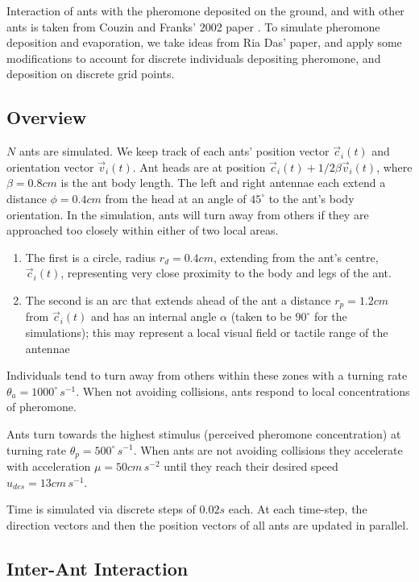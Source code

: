 Interaction of ants with the pheromone deposited on the ground, and with other ants is taken from Couzin and Franks' 2002 paper \cite{Couzin2003}. To simulate pheromone deposition and evaporation, we take ideas from Ria Das' paper, and apply some modifications to account for discrete individuals depositing pheromone, and deposition on discrete grid points.

\subsection{Overview}
$N$ ants are simulated. We keep track of each ants' position vector $\vec{c}_i(t)$ and orientation vector $\vec{v}_i(t)$. Ant heads are at position $\vec{c}_i(t) + 1/2 \beta \vec{v}_i(t)$, where $\beta = 0.8cm$ is the ant body length. The left and right antennae each extend a distance $\phi = 0.4cm$ from the head at an angle of $45^\circ$ to the ant’s body orientation. In the simulation, ants will turn away from others if they are approached too closely within either of two local areas. 

\begin{enumerate}
    \item The first is a circle, radius $r_d = 0.4 cm$, extending from the ant’s centre, $\vec{c}_i(t)$, representing very close proximity to the body and legs of the ant.
    \item The second is an arc that extends ahead of the ant a distance $r_p = 1.2 cm$ from $\vec{c}_i(t)$ and has an internal angle $\alpha$ (taken to be $90^\circ$ for the simulations); this may represent a local visual field or tactile range of the antennae
\end{enumerate} 

Individuals tend to turn away from others within these zones with a turning rate $\theta_a = 1000^\circ \, s^{-1}$. When not avoiding collisions, ants respond to local concentrations of pheromone.

Ants turn towards the highest stimulus (perceived pheromone concentration) at turning rate $\theta_p = 500^\circ \, s^{-1}$. When ants are not avoiding collisions they accelerate with acceleration $\mu = 50 cm \, s^{-2}$ until they reach their desired speed $u_{des} = 13 cm \, s^{-1}$.

Time is simulated via discrete steps of $0.02 s$ each. At each time-step, the direction vectors and then the position vectors of all ants are updated in parallel.

\subsection{Inter-Ant Interaction}

